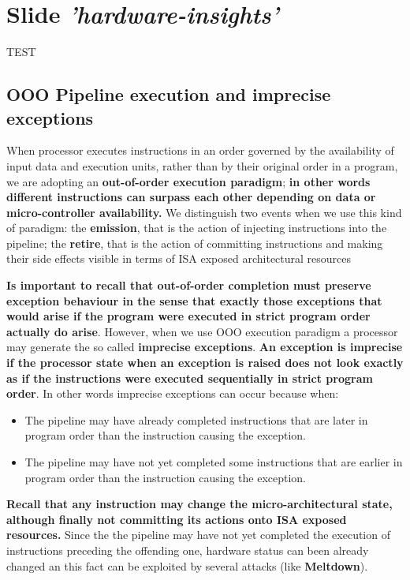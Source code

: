 \documentclass[10pt,a4paper]{article}
\begin{document}
\tableofcontents
\newpage

\section{Slide \textit{'hardware-insights'}}
TEST
\subsection{OOO Pipeline execution and imprecise exceptions}

When processor executes instructions in an order governed by the availability of input data and execution units, rather than by their original order in a program, we are adopting an \textbf{out-of-order execution paradigm}; \textbf{in other words different instructions can surpass each other depending on data or micro-controller availability.} We distinguish two events when we use this kind of paradigm: the \textbf{emission}, that is the action of injecting instructions into the pipeline; the \textbf{retire}, that is the action of committing instructions and making their side effects visible in terms of ISA exposed architectural resources

\textbf{Is important to recall that out-of-order completion must preserve exception behaviour in the sense that exactly those exceptions that would arise if the program were executed in strict program order actually do arise}. However, when we use OOO execution paradigm a processor may generate the so called \textbf{imprecise exceptions}. \textbf{An exception is imprecise if the processor state  when  an  exception  is  raised  does  not  look  exactly  as  if  the instructions were executed sequentially in strict program order}. In other words imprecise exceptions can occur because when:

\begin{itemize}
\item The pipeline may have already completed instructions that are later in program order than the instruction causing the exception.
\item The pipeline may have not yet completed some instructions that are earlier in program order than the instruction causing the exception.
\end{itemize}

\textbf{Recall that any instruction may change the micro-architectural state, although finally not committing its actions onto ISA exposed resources.} Since the the pipeline may have not yet completed the execution of instructions preceding the offending one, hardware status can been already changed an this fact can be exploited by several attacks (like \textbf{Meltdown}).
\end{document}
